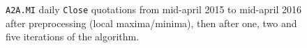 \documentclass[a4paper]{article}
\begin{document}
\begin{figure}%
	
	
	
	
	
	\caption{\texttt{A2A.MI} daily \texttt{Close} quotations from mid-april 2015 to mid-april 2016 after preprocessing (local maxima/minima), then after one, two and five iterations of the algorithm.}\label{fig:python}

\end{figure}


\clearpage %
\end{document}
